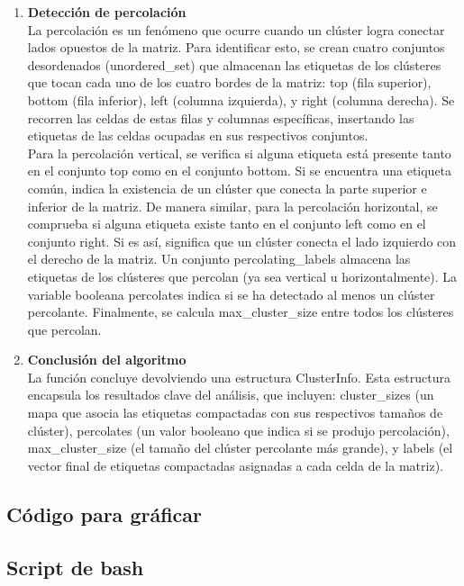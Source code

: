 \documentclass[12pt,a4paper]{article}
\begin{document}
\begin{enumerate}[label=\textbf{\arabic*)}, ref=\arabic*)]
    \item \textbf{Detección de percolación}\\
    La percolación es un fenómeno que ocurre cuando un clúster logra conectar lados opuestos de la matriz. Para identificar esto, se crean cuatro conjuntos desordenados (unordered\_set) que almacenan las etiquetas de los clústeres que tocan cada uno de los cuatro bordes de la matriz: top (fila superior), bottom (fila inferior), left (columna izquierda), y right (columna derecha). Se recorren las celdas de estas filas y columnas específicas, insertando las etiquetas de las celdas ocupadas en sus respectivos conjuntos.
\\

Para la percolación vertical, se verifica si alguna etiqueta está presente tanto en el conjunto top como en el conjunto bottom. Si se encuentra una etiqueta común, indica la existencia de un clúster que conecta la parte superior e inferior de la matriz. De manera similar, para la percolación horizontal, se comprueba si alguna etiqueta existe tanto en el conjunto left como en el conjunto right. Si es así, significa que un clúster conecta el lado izquierdo con el derecho de la matriz. Un conjunto percolating\_labels almacena las etiquetas de los clústeres que percolan (ya sea vertical u horizontalmente). La variable booleana percolates indica si se ha detectado al menos un clúster percolante. Finalmente, se calcula max\_cluster\_size entre todos los clústeres que percolan.
    \item \textbf{Conclusión del algoritmo}\\
    La función concluye devolviendo una estructura ClusterInfo. Esta estructura encapsula los resultados clave del análisis, que incluyen: cluster\_sizes (un mapa que asocia las etiquetas compactadas con sus respectivos tamaños de clúster), percolates (un valor booleano que indica si se produjo percolación), max\_cluster\_size (el tamaño del clúster percolante más grande), y labels (el vector final de etiquetas compactadas asignadas a cada celda de la matriz).
\end{enumerate}

\subsection{Código para gráficar}


\subsection{Script de bash}
\end{document}
